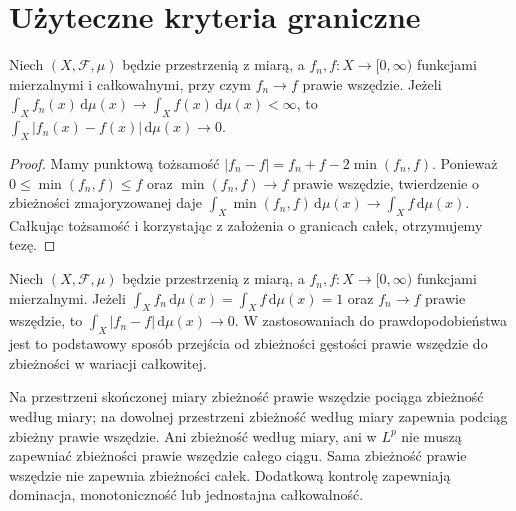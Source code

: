 \section{Użyteczne kryteria graniczne}

\begin{twierdzenie}
\label{thm:scheffe-9}
Niech $(X,\mathcal F,\mu)$ będzie przestrzenią z miarą,
a $f_n,f:X\to[0,\infty)$ funkcjami mierzalnymi
i całkowalnymi, przy czym $f_n\to f$ prawie wszędzie.
Jeżeli
$\int_Xf_n(x)\,\mathrm d\mu(x)\to
\int_Xf(x)\,\mathrm d\mu(x)<\infty$,
to
$\int_X|f_n(x)-f(x)|\,\mathrm d\mu(x)\to0$.
\end{twierdzenie}
\begin{proof}
Mamy punktową tożsamość
$|f_n-f|=f_n+f-2\min(f_n,f)$.
Ponieważ $0\le\min(f_n,f)\le f$ oraz
$\min(f_n,f)\to f$ prawie wszędzie,
twierdzenie o zbieżności zmajoryzowanej daje
$\int_X\min(f_n,f)\,\mathrm d\mu(x)\to\int_Xf\,\mathrm d\mu(x)$.
Całkując tożsamość i korzystając z założenia
o granicach całek, otrzymujemy tezę.
\end{proof}

\begin{wniosek}\label{idx:09:wniosek:14}
Niech $(X,\mathcal F,\mu)$ będzie przestrzenią z miarą,
a $f_n,f:X\to[0,\infty)$ funkcjami mierzalnymi.
Jeżeli
$\int_X f_n\,\mathrm d\mu(x)=
\int_X f\,\mathrm d\mu(x)=1$ oraz $f_n\to f$ prawie
wszędzie, to $\int_X|f_n-f|\,\mathrm d\mu(x)\to0$.
W zastosowaniach do prawdopodobieństwa jest to
podstawowy sposób przejścia od zbieżności gęstości
prawie wszędzie do zbieżności w wariacji całkowitej.
\end{wniosek}

\begin{uwaga}
\label{rem:conv-summary-9}
Na przestrzeni skończonej miary zbieżność prawie
wszędzie pociąga zbieżność według miary; na dowolnej
przestrzeni zbieżność według miary zapewnia podciąg
zbieżny prawie wszędzie. Ani zbieżność według miary,
ani w $L^p$ nie muszą zapewniać zbieżności prawie
wszędzie całego ciągu. Sama zbieżność prawie wszędzie
nie zapewnia zbieżności całek. Dodatkową kontrolę
zapewniają dominacja, monotoniczność lub jednostajna
całkowalność.
\end{uwaga}

